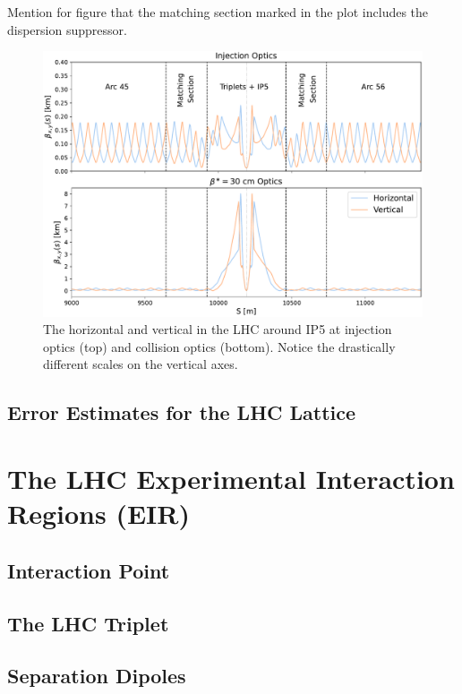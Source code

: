 Mention for figure that the matching section marked in the plot includes the dispersion suppressor.

\begin{figure}[h]
  \centering
  \includegraphics*[width=0.9\columnwidth]{Figures/Chapter3/ir5_surroundings_optics_2.pdf}
  \caption{The horizontal and vertical \betafunctions in the LHC around IP5 at injection optics (top) and collision optics (bottom). Notice the drastically different scales on the vertical axes.}
  \label{fig:ir5_and_around}
\end{figure}

\subsection{Error Estimates for the LHC Lattice}


\section{The LHC Experimental Interaction Regions (EIR)}

\subsection{Interaction Point}

\subsection{The LHC Triplet}

\subsection{Separation Dipoles}

